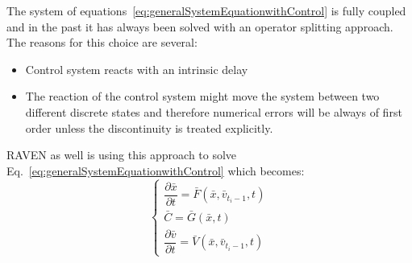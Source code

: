 \documentclass{mc2013}
\begin{document}
\label{sec:operatorSplitting}

The system of equations~\ref{eq:generalSystemEquationwithControl} is fully coupled and in the past it has always been solved with an operator splitting approach. The reasons for this choice are several:
\begin{itemize}
\item Control system reacts with an intrinsic delay
\item The reaction of the control system might move the system between two different discrete states and
therefore numerical errors will be always of first order unless the discontinuity is treated explicitly.
\end{itemize}
RAVEN as well is using this approach to solve Eq.~\ref{eq:generalSystemEquationwithControl} which becomes:
\begin{equation}
\begin{cases} 
\dfrac{\partial \bar{x}}{\partial t} = \bar{F}(\bar{x},\bar{v}_{t_{i}-1},t) \\
\bar{C} = \bar{G}(\bar{x},t) \\ 
\dfrac{\partial \bar{v}}{\partial t} = \bar{V}(\bar{x},\bar{v}_{t_{i}-1},t) 
\end{cases}
\label{eq:generalSystemEquationwithControlSplitting}
\end{equation}
\end{document}
